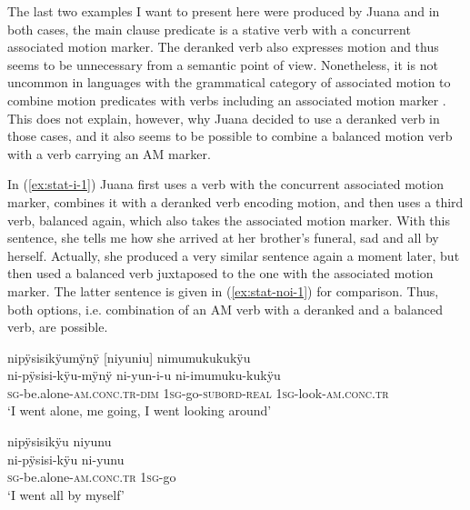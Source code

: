 
The last two examples I want to present here were produced by Juana and in both cases, the main clause predicate is a stative verb with a concurrent associated motion marker. The deranked verb also expresses motion and thus seems to be unnecessary from a semantic point of view. Nonetheless, it is not uncommon in languages with the grammatical category of associated motion to combine motion predicates with verbs including an associated motion marker \citep[128]{Rose2015}. This does not explain, however, why Juana decided to use a deranked verb in those cases, and it also seems to be possible to combine a balanced motion verb with a verb carrying an AM marker.

In (\ref{ex:stat-i-1}) Juana first uses a verb with the concurrent associated motion marker, combines it with a deranked verb encoding motion, and then uses a third verb, balanced again, which also takes the associated motion marker. With this sentence, she tells me how she arrived at her brother’s funeral, sad and all by herself. Actually, she produced a very similar sentence again a moment later, but then used a balanced verb juxtaposed to the one with the associated motion marker. The latter sentence is given in (\ref{ex:stat-noi-1}) for comparison. Thus, both options, i.e. combination of an AM verb with a deranked and a balanced verb, are possible.

\ea\label{ex:stat-i-1}
\begingl
\glpreamble nipÿsisikÿumÿnÿ \textup{[}niyuniu\textup{]} nimumukukukÿu\\
\gla ni-pÿsisi-kÿu-mÿnÿ ni-yun-i-u ni-imumuku-kukÿu\\
\textsc{sg}-be.alone-\textsc{am.conc.tr}-\textsc{dim} 1\textsc{sg}-go-\textsc{subord}-\textsc{real} 1\textsc{sg}-look-\textsc{am.conc.tr}\\
\glft ‘I went alone, me going, I went looking around’
\endgl
\trailingcitation{[jxx-p120430l-2.248]}
\xe

\ea\label{ex:stat-noi-1}
\begingl
\glpreamble nipÿsisikÿu niyunu\\
\gla ni-pÿsisi-kÿu ni-yunu\\
\textsc{sg}-be.alone-\textsc{am.conc.tr} 1\textsc{sg}-go\\
\glft ‘I went all by myself’
\endgl
\trailingcitation{[jxx-p120430l-2.250]}
\xe

